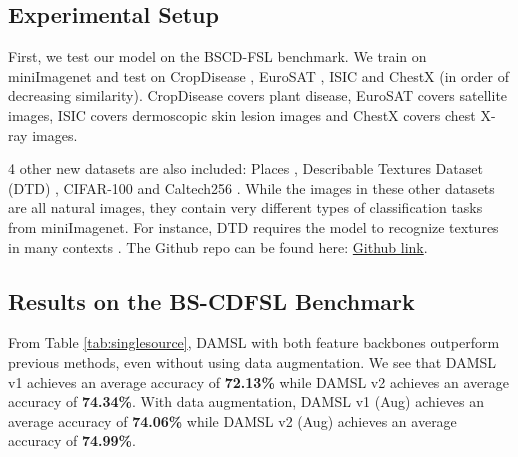 \documentclass[final]{cvpr}
\begin{document}
\subsection{Experimental Setup}
First, we test our model on the BSCD-FSL benchmark. We train on miniImagenet and test on CropDisease \cite{mohanty2016using}, EuroSAT \cite{helber2019eurosat}, ISIC \cite{tschandl2018ham10000} \cite{codella2019skin} and ChestX \cite{wang2017chestx} (in order of decreasing similarity). CropDisease covers plant disease, EuroSAT covers satellite images, ISIC covers dermoscopic skin lesion images and ChestX covers chest X-ray images. 

4 other new datasets are also included: Places \cite{zhou2017places}, Describable Textures Dataset (DTD) \cite{cimpoi2014describing}, CIFAR-100 \cite{krizhevsky2009learning} and Caltech256 \cite{griffin2007caltech}. While the images in these other datasets are all natural images, they contain very different types of classification tasks from miniImagenet. For instance, DTD requires the model to recognize textures in many contexts \cite{cimpoi2014describing}. The Github repo can be found here: \href{https://github.com/johncai117/DAMSL}{Github link}.


\subsection{Results on the BS-CDFSL Benchmark}

From Table \ref{tab:singlesource}, DAMSL with both feature backbones outperform previous methods, even without using data augmentation. We see that DAMSL v1 achieves an average accuracy of \textbf{72.13\%} while DAMSL v2 achieves an average accuracy of \textbf{74.34\%}. With data augmentation, DAMSL v1 (Aug) achieves an average accuracy of \textbf{74.06\%} while DAMSL v2 (Aug) achieves an average accuracy of \textbf{74.99\%}. 
\end{document}
